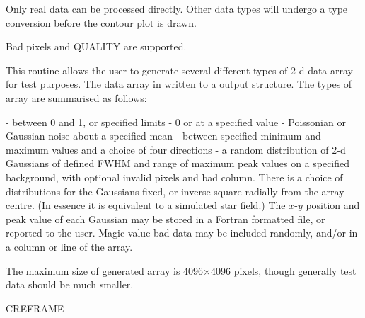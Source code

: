 {{{{         \sstitem
         Only real data can be processed directly.  Other data types
         will undergo a type conversion before the contour plot is drawn.

         \sstitem
         Bad pixels and QUALITY are supported.
      }
   }
}

\begin{manroutinedescription}
  This routine allows the user to generate several different types
  of 2-d data array for test purposes. The data array in written to
  a output {} structure.  The types of array are summarised as
  follows:

\begin{mandescription}
  - between 0 and 1, or specified limits
 - 0 or at a specified value
  - Poissonian or Gaussian noise about a
  specified mean
  - between specified minimum and maximum values
  and a choice of four directions
 - a random distribution of 2-d Gaussians of
  defined FWHM and range of maximum peak values on a specified
  background, with optional invalid pixels and bad column. There is a
  choice of distributions for the Gaussians fixed, or inverse square
  radially from the array centre. (In essence it is equivalent to a
  simulated star field.) The {$x$}-{$y$} position and peak
  value of each Gaussian may be stored in a Fortran
  formatted file, or reported to the user. Magic-value bad
  data may be included randomly, and/or in a column or line of the array.
\end{mandescription}

  The maximum size of generated array is 4096{$\times$}4096 pixels,
  though generally test data should be much smaller.

  CREFRAME


\end{manroutinedescription}}
